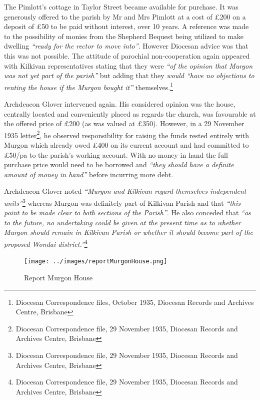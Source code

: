 The Pimlott's cottage in Taylor Street became available for purchase. It was generously offered to the parish by Mr and Mrs Pimlott at a cost of \pounds200 on a deposit of \pounds50 to be paid without interest, over 10 years. A reference was made to the possibility of monies from the Shepherd Bequest being utilized to make dwelling \emph{``ready for the rector to move into''}. However Diocesan advice was that this was not possible. The attitude of parochial non-cooperation again appeared with Kilkivan representatives stating that they were \emph{``of the opinion that Murgon was not yet part of the parish''} but adding that they \emph{would ``have no objections to renting the house if the Murgon bought it''} themselves.\footnote{Diocesan Correspondence files, October 1935, Diocesan Records and Archives Centre, Brisbane}


Archdeacon Glover intervened again. His considered opinion was the house, centrally located and conveniently placed as regards the church, was favourable at the offered price of \pounds200 (as was valued at \pounds350). However, in a 29 November 1935 letter\footnote{Diocesan Correspondence file, 29 November 1935, Diocesan Records and Archives Centre, Brisbane}, he observed responsibility for raising the funds rested entirely with Murgon which already owed \pounds400 on its current account and had committed to \pounds50/pa to the parish's working account. With no money in hand the full purchase price would need to be borrowed and \emph{``they should have a definite amount of money in hand''} before incurring more debt.


Archdeacon Glover noted \emph{``Murgon and Kilkivan regard themselves independent units''}\footnote{Diocesan Correspondence file, 29 November 1935, Diocesan Records and Archives Centre, Brisbane} whereas Murgon was definitely part of Kilkivan Parish and that \emph{``this point to be made clear to both sections of the Parish''}. He also conceded that \emph{``as to the future, no undertaking could be given at the present time as to whether Murgon should remain in Kilkivan Parish or whether it should become part of the proposed Wondai district.''}\footnote{Diocesan Correspondence file, 29 November 1935, Diocesan Records and Archives Centre, Brisbane}








\begin{figure}[!htb]
\begin{center}
\texttt{[image: ../images/reportMurgonHouse.png]}
\caption{Report Murgon House}
\end{center}
\end{figure}




